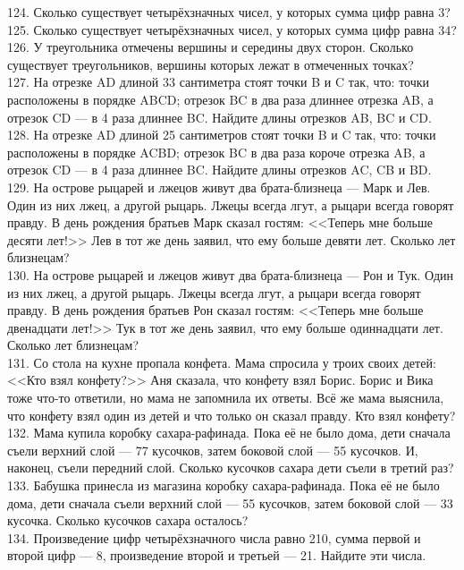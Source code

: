 124. Сколько существует четырёхзначных чисел, у которых сумма цифр равна 3?\\
125. Сколько существует четырёхзначных чисел, у которых сумма цифр равна 34?\\
126. У треугольника отмечены вершины и середины двух сторон. Сколько существует треугольников, вершины которых лежат в отмеченных точках?\\
127. На отрезке AD длиной 33 сантиметра стоят точки B и C так, что: точки расположены в порядке ABCD; отрезок BC в два раза длиннее отрезка AB, а отрезок CD --- в 4 раза длиннее BC. Найдите длины отрезков AB, BC и CD.\\
128. На отрезке AD длиной 25 сантиметров стоят точки B и C так, что: точки расположены в порядке ACBD; отрезок BC в два раза короче отрезка AB, а отрезок CD --- в 4 раза длиннее BC. Найдите длины отрезков AC, CB и BD.\\
129. На острове рыцарей и лжецов живут два брата-близнеца --- Марк и Лев. Один из них лжец, а другой рыцарь. Лжецы всегда лгут, а рыцари всегда говорят правду. В день рождения братьев Марк сказал гостям: <<Теперь мне больше десяти лет!>> Лев в тот же день заявил, что ему больше девяти лет. Сколько лет близнецам?\\
130. На острове рыцарей и лжецов живут два брата-близнеца --- Рон и Тук. Один из них лжец, а другой рыцарь. Лжецы всегда лгут, а рыцари всегда говорят правду. В день рождения братьев Рон сказал гостям: <<Теперь мне больше двенадцати лет!>> Тук в тот же день заявил, что ему больше одиннадцати лет. Сколько лет близнецам?\\
131. Со стола на кухне пропала конфета. Мама спросила у троих своих детей: <<Кто взял конфету?>> Аня сказала, что конфету взял Борис. Борис и Вика тоже что-то ответили, но мама не запомнила их ответы. Всё же мама выяснила, что конфету взял один из детей и что только он сказал правду. Кто взял конфету?\\
132. Мама купила коробку сахара-рафинада. Пока её не было дома, дети сначала съели верхний слой --- 77 кусочков, затем боковой слой --- 55 кусочков. И, наконец, съели передний слой. Сколько кусочков сахара дети съели в третий раз?\\
133. Бабушка принесла из магазина коробку сахара-рафинада. Пока её не было дома, дети сначала съели верхний слой --- 55 кусочков, затем боковой слой --- 33 кусочка. Сколько кусочков сахара осталось?\\
134. Произведение цифр четырёхзначного числа равно 210, сумма первой и второй цифр --- 8, произведение второй и третьей --- 21. Найдите эти числа.\\
